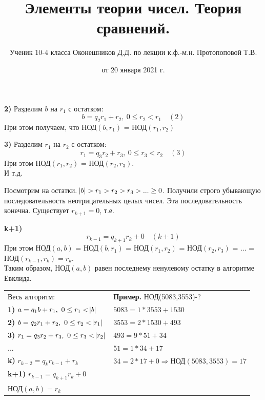 \documentclass{article}
\begin{document}
  \textbf{2)} Разделим \( b \) на \( r_1 \) с остатком: \[ b = q_2r_1 + r_2,\ 0 \leq r_2 < r_1\quad (2) \]
  При этом получаем, что НОД\( (b,r_1) \) = НОД\( (r_1,r_2) \)

  \textbf{3)} Разделим \( r_1 \) на \( r_2 \) с остатком: \[ r_1 = q_3r_2 + r_3,\ 0 \leq r_3 < r_2\quad (3) \]
  При этом НОД\( (r_1, r_2) \) = НОД\( (r_2, r_3) \).\\
  И т.д.

  Посмотрим на остатки. \( \abs{b} > r_1 > r_2 > r_3 > ... \geq 0 \). Получили строго убывающую последовательность неотрицательных целых чисел. Эта последовательность конечна. Существует \( r_{k+1} = 0 \), т.е.

  \textbf{k+1)} \[ r_{k-1} = q_{k+1}r_k + 0\quad (k+1) \]
  При этом НОД\( (a,b) \) = НОД\( (b,r_1) \) = НОД\( (r_1,r_2) \) = НОД\( (r_2,r_3) \) = ... = НОД\( (r_{k-1},r_k) = r_k \).\\
  Таким образом, НОД\( (a,b) \) равен последнему ненулевому остатку в алгоритме Евклида.

  \begin{tabular}{ll}
    Весь алгоритм: & \textbf{Пример.} НОД(5083,3553)-?\\
    \textbf{1)} \( a = q_1b + r_1,\ 0 \leq r_1 < \abs{b} \) & \( 5083 = 1*3553 + 1530 \)\\
    \textbf{2)} \( b = q_2r_1 + r_2,\ 0 \leq r_2 < \abs{r_1} \) & \( 3553 = 2*1530 + 493 \)\\
    \textbf{3)} \( r_1 = q_3r_2 + r_3,\ 0 \leq r_3 < \abs{r_2} \) & \( 493 = 9*51 + 34 \)\\
    ...& \( 51 = 1*34 + 17 \)\\
    \textbf{k)} \( r_{k-2} = q_kr_{k-1} + r_k \) & \( 34 = 2*17 + 0 \Rightarrow \textrm{НОД}(5083,3553) = 17\)\\
    \textbf{k+1)} \( r_{k-1} = q_{k+1}r_{k} + 0 \) & \\
    \( \textrm{НОД}(a,b) = r_k \) & \\
  \end{tabular}
  

    \title{Элементы теории чисел. Теория сравнений.}
    \author{Ученик 10-4 класса Оконешников Д.Д. по лекции к.ф.-м.н. Протопоповой Т.В.}
    \date{от 20 января 2021 г.}
    \maketitle
\end{document}
